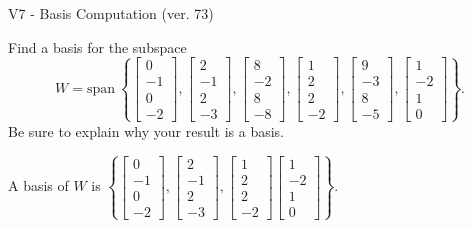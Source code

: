 \begin{exercise}
  \begin{exerciseTitle}V7 - Basis Computation (ver. 73)\end{exerciseTitle}
  \begin{exerciseStatement}
    Find a basis for the subspace 
\[W=\mathrm{span}\ \left\{\left[\begin{array}{r}
0 \\
-1 \\
0 \\
-2
\end{array}\right] , \left[\begin{array}{r}
2 \\
-1 \\
2 \\
-3
\end{array}\right] , \left[\begin{array}{r}
8 \\
-2 \\
8 \\
-8
\end{array}\right] , \left[\begin{array}{r}
1 \\
2 \\
2 \\
-2
\end{array}\right] , \left[\begin{array}{r}
9 \\
-3 \\
8 \\
-5
\end{array}\right] , \left[\begin{array}{r}
1 \\
-2 \\
1 \\
0
\end{array}\right]\right\}.\]
 Be sure to explain why your result is a basis.


  \end{exerciseStatement}
  \begin{exerciseAnswer}
   A basis of \(W\) is  \(\left\{\left[\begin{array}{r}
0 \\
-1 \\
0 \\
-2
\end{array}\right] , \left[\begin{array}{r}
2 \\
-1 \\
2 \\
-3
\end{array}\right] , \left[\begin{array}{r}
1 \\
2 \\
2 \\
-2
\end{array}\right] \left[\begin{array}{r}
1 \\
-2 \\
1 \\
0
\end{array}\right]\right\}\).
  


  \end{exerciseAnswer}
\end{exercise}